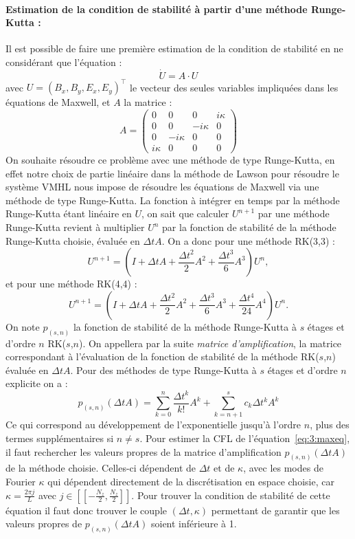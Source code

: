 \paragraph{Estimation de la condition de stabilité à partir d'une méthode Runge-Kutta :\\}
Il est possible de faire une première estimation de la condition de stabilité en ne considérant que l'équation :
\begin{equation}\label{eq:3:maxeq}
  \dot{U} = A\cdot U
\end{equation}
avec $U = (B_x,B_y,E_x,E_y)^\top$ le vecteur des seules variables impliquées dans les équations de Maxwell, et $A$ la matrice :
$$
  A = \begin{pmatrix}
    0       &  0       &  0       & i\kappa \\
    0       &  0       & -i\kappa & 0       \\
    0       & -i\kappa &  0       & 0       \\
    i\kappa &  0       &  0       & 0 
  \end{pmatrix}
$$
On souhaite résoudre ce problème avec une méthode de type Runge-Kutta, en effet notre choix de partie linéaire dans la méthode de Lawson pour résoudre le système VMHL nous impose de résoudre les équations de Maxwell via une méthode de type Runge-Kutta. La fonction à intégrer en temps par la méthode Runge-Kutta étant linéaire en $U$, on sait que calculer $U^{n+1}$ par une méthode Runge-Kutta revient à multiplier $U^n$ par la fonction de stabilité de la méthode Runge-Kutta choisie, évaluée en $\Delta tA$. On a donc pour une méthode RK(3,3) :
$$
  U^{n+1} = \left(I + \Delta t A + \frac{\Delta t^2}{2}A^2 + \frac{\Delta t^3}{6}A^3 \right)U^n,
$$
et pour une méthode RK(4,4) :
$$
  U^{n+1} = \left(I + \Delta t A + \frac{\Delta t^2}{2}A^2 + \frac{\Delta t^3}{6}A^3 + \frac{\Delta t^4}{24}A^4 \right)U^n.
$$
On note $p_{(s,n)}$ la fonction de stabilité de la méthode Runge-Kutta à $s$ étages et d'ordre $n$ RK($s$,$n$). On appellera par la suite \emph{matrice d'amplification}, la matrice correspondant à l'évaluation de la fonction de stabilité de la méthode RK($s$,$n$) évaluée en $\Delta t A$. Pour des méthodes de type Runge-Kutta à $s$ étages et d'ordre $n$ explicite on a :
$$
  p_{(s,n)}(\Delta t A) = \sum_{k=0}^n \frac{\Delta t^k}{k!}A^k + \sum_{k=n+1}^s c_k\Delta t^kA^k
$$
Ce qui correspond au développement de l'exponentielle jusqu'à l'ordre $n$, plus des termes supplémentaires si $n\neq s$. Pour estimer la CFL de l'équation~\eqref{eq:3:maxeq}, il faut rechercher les valeurs propres de la matrice d'amplification $p_{(s,n)}(\Delta t A)$ de la méthode choisie. Celles-ci dépendent de $\Delta t$ et de $\kappa$, avec les modes de Fourier $\kappa$ qui dépendent directement de la discrétisation en espace choisie, car $\kappa=\frac{2\pi j}{L}$ avec $j \in[\![-\frac{N_z}{2},\frac{N_z}{2} ]\!]$. Pour trouver la condition de stabilité de cette équation il faut donc trouver le couple $(\Delta t,\kappa)$ permettant de garantir que les valeurs propres de $p_{(s,n)}(\Delta t A)$ soient inférieure à 1.

